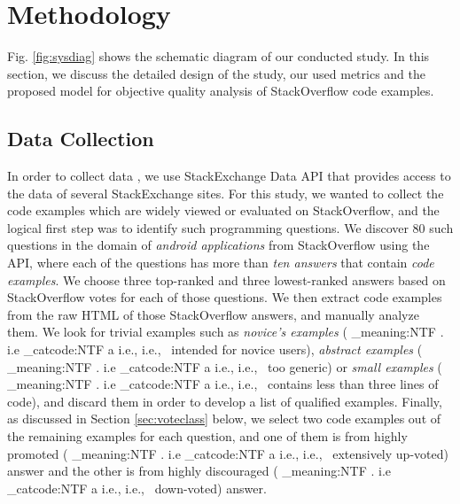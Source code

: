\documentclass[conference]{IEEEtran}
\makeatletter
\newcommand\latinabbrev[1]{
  \peek_meaning:NTF . {%
    #1\@}%
  { \peek_catcode:NTF a {%
      #1., \@ }%
    {#1., \@}}}
\def\ie{\latinabbrev{i.e}}
\makeatother
\begin{document}
\section{Methodology}
\label{sec:theory}
Fig. \ref{fig:sysdiag} shows the schematic diagram of our conducted study.
In this section, we discuss the detailed design of the study, our used metrics and the proposed model for objective quality analysis of StackOverflow code examples.
\subsection{Data Collection}
In order to collect data \cite{expdata}, we use StackExchange Data API \cite{api} that provides access to the data of several StackExchange sites. 
For this study, we wanted to collect the code examples which are widely viewed or evaluated on StackOverflow, and the logical first step was to identify such programming questions.
We discover 80 such questions in the domain of \emph{android applications} from StackOverflow using the API, where each of the questions has more than \emph{ten answers} that contain \emph{code examples}.
We choose three top-ranked and three lowest-ranked answers based on StackOverflow votes for each of those questions. We then extract code examples from the raw HTML of those StackOverflow answers, and manually analyze them.
We look for trivial examples such as \emph{novice's examples} (\ie\ intended for novice users), \emph{abstract examples} (\ie\ too generic) or \emph{small examples} (\ie\ contains less than three lines of code), and discard them in order to develop a list of qualified examples. 
Finally, as discussed in Section \ref{sec:voteclass} below, we select two code examples out of the remaining examples for each question, and one of them is from highly promoted (\ie\ extensively up-voted) answer and the other is from highly discouraged (\ie\ down-voted) answer.
\end{document}
